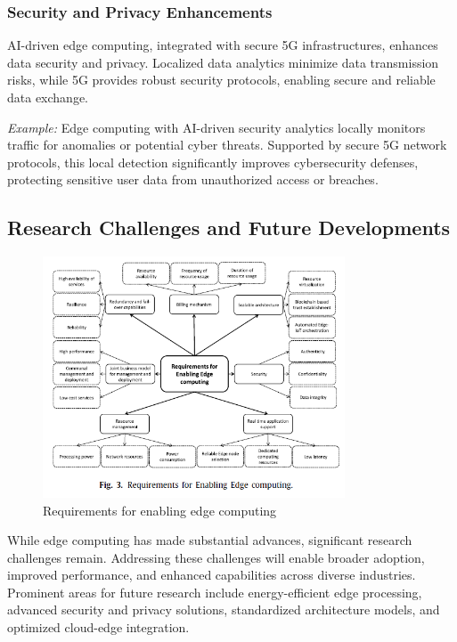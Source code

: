 \documentclass[runningheads]{llncs}
\begin{document}
\subsubsection{Security and Privacy Enhancements}
AI-driven edge computing, integrated with secure 5G infrastructures, enhances data security and privacy. Localized data analytics minimize data transmission risks, while 5G provides robust security protocols, enabling secure and reliable data exchange.

\textit{Example:} Edge computing with AI-driven security analytics locally monitors traffic for anomalies or potential cyber threats. Supported by secure 5G network protocols, this local detection significantly improves cybersecurity defenses, protecting sensitive user data from unauthorized access or breaches.



\subsection{Research Challenges and Future Developments}

\begin{figure}[ht]
    \centering
    \includegraphics[width=0.8\textwidth]{IMG/2.png}
    \caption{Requirements for enabling edge computing}
    \label{fig:edge_requirements}
    \end{figure} 
\FloatBarrier

While edge computing has made substantial advances, significant research challenges remain. Addressing these challenges will enable broader adoption, improved performance, and enhanced capabilities across diverse industries. Prominent areas for future research include energy-efficient edge processing, advanced security and privacy solutions, standardized architecture models, and optimized cloud-edge integration.
\end{document}
